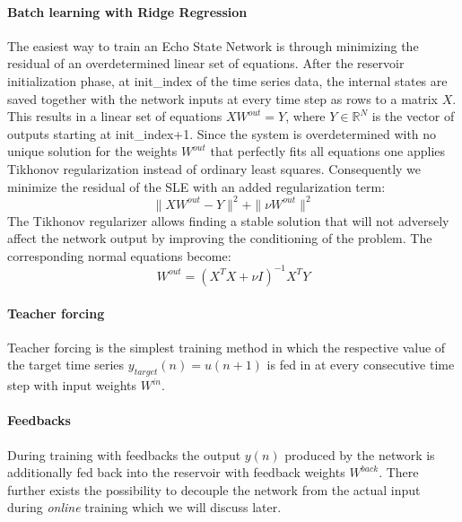 \paragraph*{Batch learning with Ridge Regression}
The easiest way to train an Echo State Network is through minimizing the residual of an overdetermined linear set of equations. After the reservoir initialization phase, at init\_index of the time series data, the internal states are saved together with the network inputs at every time step as rows to a matrix $X$. This results in a linear set of equations $XW^{out}=Y$, where $Y \in \mathbb{R}^N$ is the vector of outputs starting at init\_index+1. Since the system is overdetermined with no unique solution for the weights $W^{out}$ that perfectly fits all equations one applies Tikhonov regularization instead of ordinary least squares. Consequently we minimize the residual of the SLE with an added regularization term:\\
\begin{equation}
    \|XW^{out}-Y\|^2 + \|\nu W^{out}\|^2
\end{equation}
The Tikhonov regularizer allows finding a stable solution that will not adversely affect the network output by improving the conditioning of the problem. The corresponding normal equations become:
\begin{equation}
    W^{out}=(X^TX+\nu I)^{-1} X^TY
\end{equation}

\paragraph*{Teacher forcing}
Teacher forcing is the simplest training method in which the respective value of the target time series $y_{target}(n)=u(n+1)$ is fed in at every consecutive time step with input weights $W^{in}$. 

\paragraph*{Feedbacks}
During training with feedbacks the output $y(n)$ produced by the network is additionally fed back into the reservoir with feedback weights $W^{back}$. There further exists the possibility to decouple the network from the actual input during \emph{online} training which we will discuss later.

